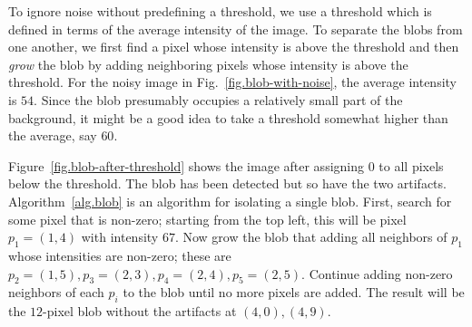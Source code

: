 
To ignore noise without predefining a threshold, we use a threshold which is defined in terms of the average intensity of the image. To separate the blobs from one another, we first find a pixel whose intensity is above the threshold and then \emph{grow} the blob by adding neighboring pixels whose intensity is above the threshold. For the noisy image in Fig.~\ref{fig.blob-with-noise}, the average intensity is $54$. Since the blob presumably occupies a relatively small part of the background, it might be a good idea to take a threshold somewhat higher than the average, say $60$.

Figure~\ref{fig.blob-after-threshold} shows the image after assigning $0$ to all pixels below the threshold. The blob has been detected but so have the two artifacts. Algorithm~\ref{alg.blob} is an algorithm for isolating a single blob. First, search for some pixel that is non-zero; starting from the top left, this will be pixel $p_1=(1,4)$ with intensity $67$. Now grow the blob that adding all neighbors of $p_1$ whose intensities are non-zero; these are $p_2=(1,5), p_3=(2,3), p_4=(2,4), p_5=(2,5)$. Continue adding non-zero neighbors of each $p_i$ to the blob until no more pixels are added. The result will be the $12$-pixel blob without the artifacts at $(4,0), (4,9)$.

